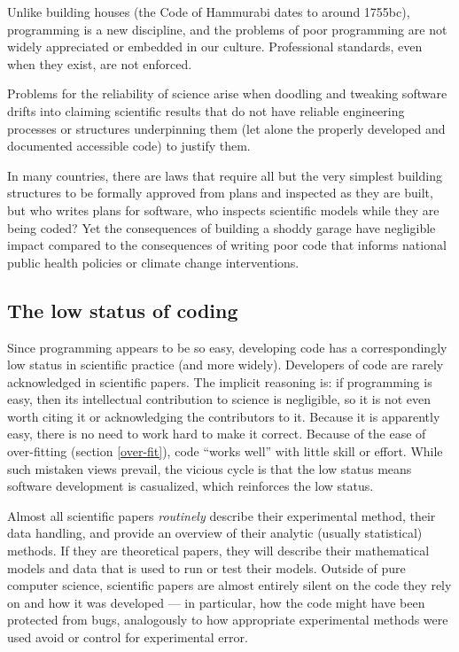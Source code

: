 \documentclass{comjnl}
\begin{document}
Unlike building houses (the Code of Hammurabi dates to around 1755{\sc bc}), programming is a new discipline, and the problems of poor programming are not widely appreciated or embedded in our culture. Professional standards, even when they exist, are not enforced. 

Problems for the reliability of science arise when doodling and tweaking software drifts into claiming scientific results that do not have reliable engineering processes or structures underpinning them (let alone the properly developed and documented accessible code) to justify them. 

In many countries, there are laws that require all but the very simplest building structures to be formally approved from plans and inspected as they are built, but who writes plans for software, who inspects scientific models while they are being coded? Yet the consequences of building a shoddy garage have negligible impact compared to the consequences of writing poor code that informs national public health policies or climate change interventions.

\subsection{The low status of coding}
Since programming appears to be so easy, developing code has a correspondingly low status in scientific practice (and more widely). Developers of code are rarely acknowledged in scientific papers. The implicit reasoning is: if programming is easy, then its intellectual contribution to science is negligible, so it is not even worth citing it or acknowledging the contributors to it. Because it is apparently easy, there is no need to work hard to make it correct. Because of the ease of over-fitting (section \ref{over-fit}), code ``works well'' with little skill or effort. While such mistaken views prevail, the vicious cycle is that the low status means software development is casualized, which reinforces the low status.

Almost all scientific papers \emph{routinely\/} describe their experimental method, their data handling, and provide an overview of their analytic (usually statistical) methods. If they are theoretical papers, they will describe their mathematical models and data that is used to run or test their models. Outside of pure computer science, scientific papers are almost entirely silent on the code they rely on and how it was developed --- in particular, how the code might have been protected from bugs, analogously to how appropriate experimental methods were used avoid or control for experimental error. 
\end{document}
